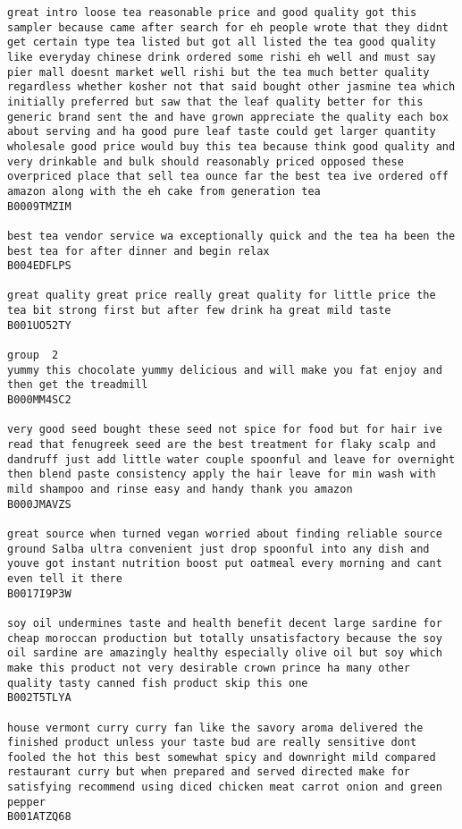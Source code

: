 \documentclass[11pt]{article}
\begin{document}
\begin{Verbatim}[commandchars=\\\{\}]
great intro loose tea reasonable price and good quality got this sampler because came after search for eh people wrote that they didnt get certain type tea listed but got all listed the tea good quality like everyday chinese drink ordered some rishi eh well and must say pier mall doesnt market well rishi but the tea much better quality regardless whether kosher not that said bought other jasmine tea which initially preferred but saw that the leaf quality better for this generic brand sent the and have grown appreciate the quality each box about serving and ha good pure leaf taste could get larger quantity wholesale good price would buy this tea because think good quality and very drinkable and bulk should reasonably priced opposed these overpriced place that sell tea ounce far the best tea ive ordered off amazon along with the eh cake from generation tea
B0009TMZIM

best tea vendor service wa exceptionally quick and the tea ha been the best tea for after dinner and begin relax
B004EDFLPS

great quality great price really great quality for little price the tea bit strong first but after few drink ha great mild taste
B001UO52TY

group  2
yummy this chocolate yummy delicious and will make you fat enjoy and then get the treadmill
B000MM4SC2

very good seed bought these seed not spice for food but for hair ive read that fenugreek seed are the best treatment for flaky scalp and dandruff just add little water couple spoonful and leave for overnight then blend paste consistency apply the hair leave for min wash with mild shampoo and rinse easy and handy thank you amazon
B000JMAVZS

great source when turned vegan worried about finding reliable source ground Salba ultra convenient just drop spoonful into any dish and youve got instant nutrition boost put oatmeal every morning and cant even tell it there
B0017I9P3W

soy oil undermines taste and health benefit decent large sardine for cheap moroccan production but totally unsatisfactory because the soy oil sardine are amazingly healthy especially olive oil but soy which make this product not very desirable crown prince ha many other quality tasty canned fish product skip this one
B002T5TLYA

house vermont curry curry fan like the savory aroma delivered the finished product unless your taste bud are really sensitive dont fooled the hot this best somewhat spicy and downright mild compared restaurant curry but when prepared and served directed make for satisfying recommend using diced chicken meat carrot onion and green pepper
B001ATZQ68


\end{Verbatim}
\end{document}

